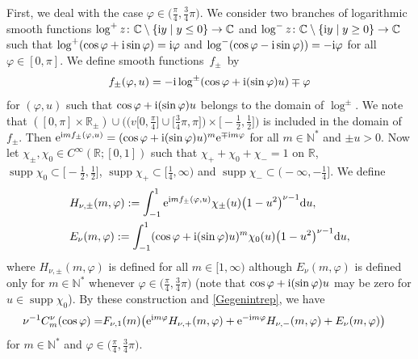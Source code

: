 \documentclass[10pt,a4paper]{amsart}
\numberwithin{equation}{section}
\def\R{\mathbb{R}}%
\DeclareMathOperator{\supp}{supp}%
\def\f{\varphi}
\def\n{\nu}
\begin{document}
First, we deal with the case $\f\in \bigl(\frac{\pi}{4}, \frac{3}{4}\pi\bigr)$.
We consider two branches of logarithmic smooth functions $\log^+z\colon\mathbb{C}\setminus \{{\rm i}y\mid y\leq 0\}\to \mathbb{C}$ and $\log^-z\colon\mathbb{C}\setminus \{{\rm i}y\mid y\geq 0\}\to \mathbb{C}$ such that $\log^+(\cos \f+{\rm i}\sin \f)={\rm i}\f$ and $\log^-(\cos\f-{\rm i}\sin\f))=-{\rm i}\f$ for all $\f\in [0,\pi]$. We define smooth functions~$f_{\pm}$~by
\begin{align*}
f_{\pm}(\f,u)=-{\rm i}\log^{\pm}(\cos\f+{\rm i}(\sin\f)u)\mp \f
\end{align*}
for $(\f,u)$ such that $\cos\f+{\rm i}(\sin\f)u$ belongs to the domain of $\log^{\pm}$. We note that
$([0,\pi]\times \R_{\pm})\cup \bigl(\bigl(v[0,\frac{\pi}{4}\bigr]\cup \bigl[\frac{3}{4}\pi,\pi\bigr]\bigr)\times \bigl[-\frac{1}{2},\frac{1}{2}\bigr] \bigr)$ is included in the domain of $f_{\pm}$.
Then ${\rm e}^{{\rm i}mf_{\pm}(\f,u)}=(\cos\f+{\rm i}(\sin\f)u)^m{\rm e}^{\mp {\rm i}m\f}$ for all $m\in\mathbb{N}^*$ and $\pm u>0$.
Now let $\chi_{\pm},\chi_0\in C^{\infty}(\R;[0,1])$ such that $\chi_++\chi_0+\chi_-=1$ on $\R$, $\supp\chi_0\subset \bigl[-\frac{1}{2},\frac{1}{2}\bigr]$, $\supp \chi_+\subset \bigl[\frac{1}{4},\infty\bigr)$ and $\supp\chi_-\subset \bigl(-\infty,-\frac{1}{4}\bigr]$. We define
\begin{align*}
&H_{\n,\pm}(m,\f):=\int_{-1}^1{\rm e}^{{\rm i}mf_{\pm}(\f,u)}\chi_{\pm}(u)\bigl(1-u^2\bigr)^{\n-1}{\rm d}u,\\
&E_{\n}(m,\f):=\int_{-1}^1(\cos \f+{\rm i}(\sin\f)u)^m\chi_{0}(u)\bigl(1-u^2\bigr)^{\n-1}{\rm d}u,
\end{align*}
where $H_{\n,\pm}(m,\f)$ is defined for all $m\in [1,\infty)$ although $E_{\n}(m,\f)$ is defined only for $m\in \mathbb{N}^*$ whenever $\f\in \bigl(\frac{\pi}{4}, \frac{3}{4}\pi\bigr)$ (note that $\cos\f+{\rm i}(\sin \f)u$ may be zero for $u\in \supp \chi_0$). By these construction and \eqref{Gegenintrep}, we have
\begin{align}\label{Gegendecom}
\n^{-1}C_m^{\n}(\cos\f)=&F_{\n,1}(m)\bigl({\rm e}^{{\rm i}m\f}H_{\n,+}(m,\f)+{\rm e}^{-{\rm i}m\f}H_{\n,-}(m,\f)+E_{\n}(m,\f) \bigr)
\end{align}
for $m\in\mathbb{N}^*$ and $\f\in \bigl(\frac{\pi}{4}, \frac{3}{4}\pi\bigr)$.
\end{document}
